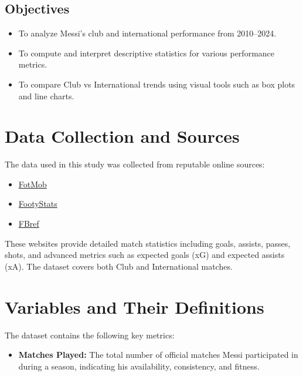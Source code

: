 \documentclass[12pt,a4paper]{report}
\begin{document}
\begin{titlepage}
\section*{Objectives}
\begin{itemize}
    \item To analyze Messi's club and international performance from 2010--2024.
    \item To compute and interpret descriptive statistics for various performance metrics.
    \item To compare Club vs International trends using visual tools such as box plots and line charts.
\end{itemize}

\chapter{Data Collection and Sources}
The data used in this study was collected from reputable online sources:
\begin{itemize}
    \item \href{https://www.fotmob.com/players/30981/l-messi}{FotMob}
    \item \href{https://footystats.org/players/argentina/lionel-messi}{FootyStats}
    \item \href{https://fbref.com/en/players/d70ce98e/Lionel-Messi}{FBref}
\end{itemize}

These websites provide detailed match statistics including goals, assists, passes, shots, and advanced metrics such as expected goals (xG) and expected assists (xA). The dataset covers both Club and International matches.

\chapter{Variables and Their Definitions}
The dataset contains the following key metrics:
\begin{itemize}
    \begin{itemize}
    \item \textbf{Matches Played:} The total number of official matches Messi participated in during a season, indicating his availability, consistency, and fitness.


\end{itemize}
\end{itemize}
\end{titlepage}
\end{document}
